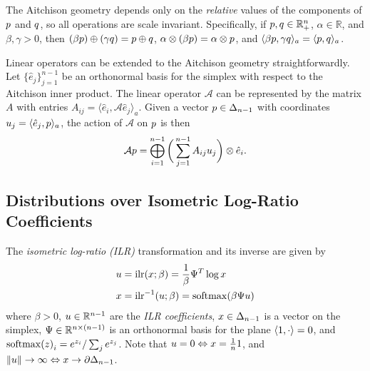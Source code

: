 The Aitchison geometry depends only on the \textit{relative} values of the components of $p$ and $q$, so all operations are scale invariant.
Specifically, if $p, q \in \mathbb{R}_{+}^{n}$, $\alpha \in \mathbb{R}$, and $\beta, \gamma > 0$, then $(\beta p) \oplus (\gamma q) = p \oplus q$, $\alpha \otimes (\beta p) = \alpha \otimes p$, and $\langle \beta p, \gamma q \rangle_a = \langle p, q \rangle_a$.

Linear operators can be extended to the Aitchison geometry straightforwardly.
Let $\{\hat{e}_j\}_{j=1}^{n-1}$ be an orthonormal basis for the simplex with respect to the Aitchison inner product.
The linear operator $\mathcal{A}$ can be represented by the matrix $A$ with entries $A_{ij} = \langle \hat{e}_i, \mathcal{A}\hat{e}_j \rangle_a$.
Given a vector $p \in \Delta_{n-1}$ with coordinates $u_{j} = \langle \hat{e}_j, p \rangle_{a}$, the action of $\mathcal{A}$ on $p$ is then
\begin{align}\label{eqn:apx:aitchison_linear_operator}
    \mathcal{A} p = \bigoplus_{i=1}^{n-1} \bigg( \sum_{j=1}^{n-1} A_{ij} u_{j} \bigg) \otimes \hat{e}_i.
\end{align}

\subsection{Distributions over Isometric Log-Ratio Coefficients}\label{sec:apx:ilr_distbn}

The \textit{isometric log-ratio (\gls*{ILR})} transformation and its inverse are given by~\citep{egozcue_isometric_2003}
\begin{align}
    \vv{u} & = \ILR{\vv{x};
        \beta} = \frac{1}{\beta} \vv{\Psi}^T \log \vv{x} \label{eqn:apx:simplex_inverse_ilr}         \\
    \vv{x} & = \InvILR{\vv{u}; \beta} = \Softmax{\beta \vv{\Psi} \vv{u}} \label{eqn:apx:simplex_ilr}
\end{align}
where $\beta > 0$, $u \in \mathbb{R}^{n-1}$ are the \textit{\gls*{ILR} coefficients}, $x \in \Delta_{n-1}$ is a vector on the simplex, $\Psi \in \mathbb{R}^{n \times (n-1)}$ is an orthonormal basis for the plane $\langle \mathrm{1}, \cdot \rangle = 0$, and $\Softmax{\vv{z}}_{i} = e^{\vv{z}_{i}} / \sum_{j} e^{\vv{z}_{j}}$.
Note that $u = \mathrm{0} \Leftrightarrow x = \frac{1}{n} \mathrm{1}$, and $\lVert u \rVert \to \infty \Leftrightarrow x \to \partial \Delta_{n-1}$.


